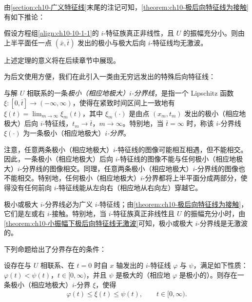 \documentclass[../../main.tex]{subfiles}
\begin{document}
由\cref{section:ch10-广义特征线}末尾的注记可知，\cref{theorem:ch10-极后向特征线为接触}有如下推论：

\begin{theorem}\label{theorem:ch10-小振幅下极后向特征线无激波}
假设方程组\eqref{align:ch10-10-1-1}的 $i$-特征族真正非线性，且 $U$ 的振幅充分小。则由上半平面任一点 $(\bar{x},\bar{t})$ 发出的极小与极大后向 $i$-特征线均无激波。
\end{theorem}

上述定理的意义将在后续章节中展现。

为后文使用方便，我们在此引入一类由无穷远发出的特殊后向特征线：

\begin{definition}[$i$-分界线与 $i$-分界]\label{definition:ch10-i分界线}
与解 $U$ 相联系的一条\emph{极小（相应地极大）$i$-分界线}，是指一个 Lipschitz 函数 $\xi:[0,\bar{t}]\to(-\infty,\infty)$，使得在紧致时间区间上一致地有 $\xi(t)=\lim_{m\to\infty}\xi_{m}(t)$，其中 $\xi_{m}(\cdot)$ 是由点 $(x_{m},t_{m})$ 发出的极小（相应地极大）后向 $i$-特征线，$t_{m}\to\bar{t}$，$m\to\infty$。特别地，当 $\bar{t}=\infty$ 时，称该 $i$-分界线 $\xi(\cdot)$ 为一条极小（相应地极大）\emph{$i$-分界}。
\end{definition}

注意，任意两条极小（相应地极大）$i$-特征线的图像可能相互相遇，但不能相交。因此，一条极小（相应地极大）后向 $i$-特征线的图像不能与任何极小（相应地极大）$i$-分界线的图像相交。同理，任意两条极小（相应地极大）$i$-分界线的图像也不能相交。特别地，任何极小（相应地极大）$i$-分界都将上半平面分成两部分，使得没有任何前向 $i$-特征线能从左向右（相应地从右向左）穿越它。

极小或极大 $i$-分界线必为广义 $i$-特征线；由\cref{theorem:ch10-极后向特征线为接触}，它们是左或右 $i$-接触。特别地，当 $i$-特征族真正非线性且 $U$ 的振幅充分小时，由\cref{theorem:ch10-小振幅下极后向特征线无激波}可知，极小或极大 $i$-分界线是无激波的。

下列命题给出了分界存在的条件：

\begin{lemma}\label{lemma:ch10-分界存在性}
设存在与 $U$ 相联系、在 $t=0$ 时自 $x$ 轴发出的 $i$-特征线 $\varphi$ 与 $\psi$，满足如下性质：$\varphi(t)<\psi(t)$，$t\in[0,\infty)$，并且 $\psi$ 是极大的（相应地 $\varphi$ 是极小的）。则存在一条极小（相应地极大）$i$-分界 $\xi$，使得
\begin{align*}
\varphi(t)\leqslant\xi(t)\leqslant\psi(t),\qquad t\in[0,\infty).
\end{align*}
\end{lemma}
\end{document}
